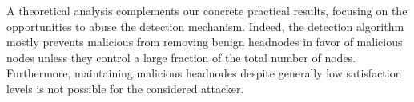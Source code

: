 A theoretical analysis complements our concrete practical results, focusing on the opportunities to abuse the detection mechanism. 
Indeed, the detection algorithm mostly prevents malicious from removing benign headnodes in favor of malicious nodes unless they control a large fraction of the total number of nodes. 
Furthermore, maintaining malicious headnodes despite generally low satisfaction levels is not possible for the considered attacker. 
  



% 





 


